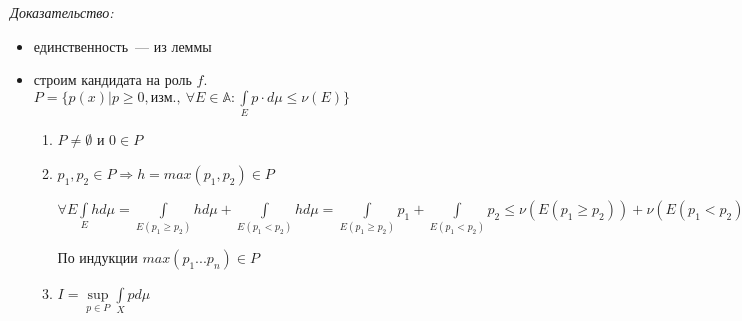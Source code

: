 \documentclass[paper=a4, fontsize=17pt]{article}
\begin{document}
	\emph{Доказательство:}
		\begin{itemize}
			\item единственность~--- из леммы
			\item строим кандидата на роль $f$. $P = \{p(x) | p \geq 0, \text{изм.},\ \forall E \in \mathbb{A} : \int\limits_E p \cdot d\mu \leq \nu(E)\}$
			\begin{enumerate}
				\item
				$P \neq \emptyset$ и $0 \in P$
				\item
				$p_1, p_2 \in P \Rightarrow h = max(p_1, p_2) \in P$

				$\forall E \int\limits_E h d\mu = \int\limits_{E(p_1 \geq p_2)} h d\mu + \int\limits_{E(p_1 < p_2)} h d\mu =
				\int\limits_{E(p_1 \geq p_2)} p_1 + \int\limits_{E(p_1 < p_2)} p_2 \leq \nu(E(p_1 \geq p_2)) + \nu(E(p_1 < p_2)) = \nu E$

				По индукции $max(p_1...p_n)\in P$
				\item
				$I = \sup\limits_{p \in P} \int\limits_X p d\mu$


\end{enumerate}
\end{itemize}
\end{document}
